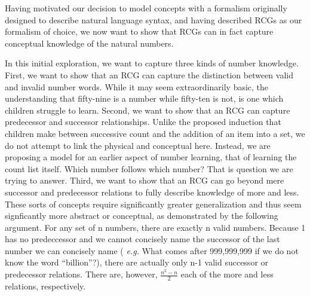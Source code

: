 \documentclass[10pt,letterpaper]{article}
\begin{document}
Having motivated our decision to model concepts with a formalism
originally designed to describe natural language syntax, and having
described RCGs as our formalism of choice, we now want to show that
RCGs can in fact capture conceptual knowledge of the natural numbers.

In this initial exploration, we want to capture three kinds of number
knowledge. First, we want to show that an RCG can capture the
distinction between valid and invalid number words. While it may seem
extraordinarily basic, the understanding that fifty-nine is a number
while fifty-ten is not, is one which children struggle to learn.
Second, we want to show that an RCG can capture predecessor and
successor relationships. Unlike the proposed induction that children
make between successive count and the addition of an item into a set,
we do not attempt to link the physical and conceptual here. Instead,
we are proposing a model for an earlier aspect of number learning,
that of learning the count list itself. Which number follows which
number? That is question we are trying to answer. Third, we want to
show that an RCG can go beyond mere successor and predecessor
relations to fully describe knowledge of more and less. These sorts of
concepts require significantly greater generalization and thus seem
signficantly more abstract or conceptual, as demonstrated by the
following argument. For any set of n numbers, there are exactly n
valid numbers. Because 1 has no predeccessor and we cannot concisely
name the successor of the last number we can concisely name ({\it
  e.g.} What comes after 999,999,999 if we do not know the word
``billion''?), there are actually only n-1 valid successor or
predecessor relations. There are, however, $\frac{n^2-n}{2}$ each of
the more and less relations, respectively.
\end{document}
